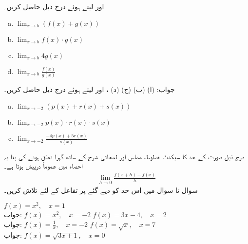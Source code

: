  اور  لیتے ہوئے درج ذیل حاصل کریں۔
\begin{multicols}{2}
\begin{enumerate}[a.]
\item
$\lim_{x\to b} (f(x)+g(x))$
\item
$\lim_{x\to b} f(x)\cdot g(x)$
\item
$\lim_{x\to b} 4g(x)$
\item
$\lim_{x\to b} \tfrac{f(x)}{g(x)}$
\end{enumerate}
\end{multicols}
جواب: (ا)  (ب)  (ج)  (د) 
،  اور  لیتے ہوئے درج ذیل حاصل کریں۔
\begin{multicols}{2}
\begin{enumerate}[a.]
\item
$\lim_{x\to -2} (p(x)+r(x)+s(x))$
\item
$\lim_{x\to -2} p(x)\cdot r(x)\cdot s(x)$
\item
$\lim_{x\to -2} \tfrac{-4p(x)+5r(x)}{s(x)}$
\end{enumerate}
\end{multicols}

درج ذیل صورت کے حد کا سیکنٹ خطوط، مماس اور لمحاتی شرح کے ساتھ گہرا تعلق ہونے کی بنا یہ احصاء میں عموماً درپیش ہوتا ہے۔
\begin{align*}
\lim_{h\to 0}\frac{f(x+h)-f(x)}{h}
\end{align*}
سوال  تا سوال  میں اس حد کو دیے گئے  پر تفاعل  کے لئے تلاش کریں۔

$f(x)=x^2,\quad x=1$\\
جواب: 
$f(x)=x^2,\quad x=-2$
$f(x)=3x-4,\quad x=2$\\
جواب: 
$f(x)=\tfrac{1}{x},\quad x=-2$
$f(x)=\sqrt{x},\quad x=7$\\
جواب: 
$f(x)=\sqrt{3x+1},\quad x=0$

